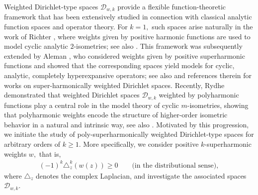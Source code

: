 \documentclass[10pt,oneside,reqno]{amsart}
\theoremstyle{definition}
\theoremstyle{remark}
\numberwithin{equation}{section}
\begin{document}
 
Weighted Dirichlet-type spaces $\mathscr D_{w,k}$ provide a flexible function-theoretic framework that has been extensively studied in connection with classical analytic function spaces and operator theory. For $k=1,$ such spaces arise naturally in the work of Richter \cite{Richter91}, where weights given by positive harmonic functions are used to model cyclic analytic $2$-isometries; see also \cite{RS1991LDI, RSMULTINV, SARA1997, Primerbook}.  This framework was subsequently extended by Aleman \cite{1993multiplication}, who considered weights given by positive superharmonic functions and showed that the corresponding spaces yield models for cyclic, analytic, completely hyperexpansive operators; see also \cite{zbMATH01797590, zbMATH06544404, MR2019HM, zbMATH07984371, zbMATH07962947} and references therein for works on super-harmonically weighted Dirichlet spaces. Recently, Rydhe \cite{Rydhe19} demonstrated that weighted Dirichlet spaces $\mathscr D_{w,k}$ weighted by polyharmonic functions play a central role in the model theory of cyclic $m$-isometries, showing that polyharmonic weights encode the structure of higher-order isometric behavior in a natural and intrinsic way, see also \cite{LuoRichter,GGR22,GGRLDF,LuoRydhe25}. Motivated by this progression, we initiate the study of poly-superharmonically weighted Dirichlet-type spaces for arbitrary orders of $k\geqslant 1.$ More specifically, we consider positive $k$-superharmonic weights $w,$ that is,
\begin{align*}
   (-1)^k\triangle_z^k(w(z)) \geqslant 0 \qquad \mbox{(in the distributional sense)},    
\end{align*}
where $\triangle_z$ denotes the complex Laplacian, and investigate the associated spaces $\mathscr D_{w,k}.$ 
\end{document}
